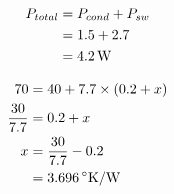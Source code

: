 \subsection{}

\begin{align*}
P_{total} & = P_{cond} + P_{sw} \\
          & = 1.5 + 2.7 \\
          & = \unit[4.2]{W}
\end{align*}

\begin{center}

\end{center}

\begin{align*}
70 & = 40 + 7.7 \times (0.2 + x) \\
\frac{30}{7.7} & = 0.2 + x \\
x & = \frac{30}{7.7} - 0.2 \\
  & = \unit[3.696]{^\circ{}K/W}
\end{align*}